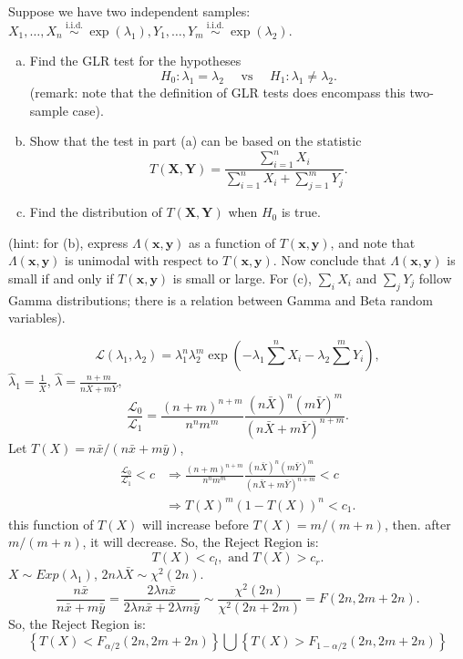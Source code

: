 \begin{ex}
    Suppose we have two independent samples: \(X_{1}, \ldots, X_{n} \stackrel{\text { i.i.d. }}{\sim} \exp \left(\lambda_{1}\right), Y_{1}, \ldots, Y_{m} \stackrel{\text { i.i.d. }}{\sim} \exp \left(\lambda_{2}\right)\). 
    \begin{enumerate}[(a)]
        \item Find the GLR test for the hypotheses
        \[
        H_{0}: \lambda_{1}=\lambda_{2} \quad \text { vs } \quad H_{1}: \lambda_{1} \neq \lambda_{2}. 
        \]
        (remark: note that the definition of GLR tests does encompass this two-sample case). 
        \item Show that the test in part (a) can be based on the statistic
        \[
        T(\mathbf{X}, \mathbf{Y})=\frac{\sum_{i=1}^{n} X_{i}}{\sum_{i=1}^{n} X_{i}+\sum_{j=1}^{m} Y_{j}}. 
        \]
        \item Find the distribution of \(T(\mathbf{X}, \mathbf{Y})\) when \(H_{0}\) is true. 
    \end{enumerate}
    (hint: for (b), express \(\Lambda(\mathbf{x}, \mathbf{y})\) as a function of \(T(\mathbf{x}, \mathbf{y})\), and note that \(\Lambda(\mathbf{x}, \mathbf{y})\) is unimodal with respect to \(T(\mathbf{x}, \mathbf{y})\). Now conclude that \(\Lambda(\mathbf{x}, \mathbf{y})\) is small if and only if \(T(\mathbf{x}, \mathbf{y})\) is small or large. For (c), \(\sum_{i} X_{i}\) and \(\sum_{j} Y_{j}\) follow Gamma distributions; there is a relation between Gamma and Beta random variables).
\end{ex}

\begin{solution}
        \[
            \mathcal{L}(\lambda_1, \lambda_2)=\lambda_1^n\lambda_2^m\exp\left(-\lambda_1\sum^nX_i-\lambda_2\sum^mY_i\right), 
        \]
        $\hat{\lambda}_1=\frac{1}{\bar{X}}$, $\hat{\lambda}=\frac{n+m}{n\bar{X}+m\bar{Y}}$, 
        \[
            \frac{\mathcal{L}_0}{\mathcal{L}_1}=\frac{(n+m)^{n+m}}{n^nm^m}\frac{(n\bar{X})^n(m\bar{Y})^m}{(n\bar{X}+m\bar{Y})^{n+m}}. 
        \]
        Let $T(X)=n\bar{x}/(n\bar{x}+m\bar{y})$, 
        \[
            \begin{aligned}
                \frac{\mathcal{L}_0}{\mathcal{L}_1}<c&\Rightarrow \frac{(n+m)^{n+m}}{n^nm^m}\frac{(n\bar{X})^n(m\bar{Y})^m}{(n\bar{X}+m\bar{Y})^{n+m}}<c\\
                &\Rightarrow  T(X)^m(1-T(X))^n<c_1. 
            \end{aligned}
        \]
        this function of $T(X)$ will increase before $T(X)=m/(m+n)$, then. after $m/(m+n)$, it will decrease. So, the Reject Region is:
        \[
            T(X)<c_l, \text{ and } T(X)>c_r.
        \]
        $X\sim Exp(\lambda_1)$, $2n\lambda\bar{X}\sim \chi^2(2n)$. \[
            \frac{n\bar{x}}{n\bar{x}+m\bar{y}}=\frac{2\lambda n\bar{x}}{2\lambda n\bar{x}+2\lambda m\bar{y}}\sim\frac{\chi^2(2n)}{\chi^2(2n+2m)}=F(2n,2m+2n). 
        \]
        So, the Reject Region is:
        \[
            \left\{T(X)<F_{\alpha/2}(2n,2m+2n)\right\} \bigcup \left\{T(X)>F_{1-\alpha/2}(2n,2m+2n)\right\} 
        \]
\end{solution}

